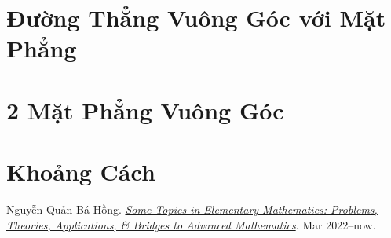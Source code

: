 \documentclass[oneside]{book}
\numberwithin{equation}{section}
\begin{document}
\section{Đường Thẳng Vuông Góc với Mặt Phẳng}

\section{2 Mặt Phẳng Vuông Góc}

\section{Khoảng Cách}


\begin{thebibliography}{99}
	 Nguyễn Quản Bá Hồng. \href{https://github.com/NQBH/hobby/blob/master/elementary_mathematics/some_topics_in_elementary_mathematics_problems_theories_applications_bridges_to_advanced_mathematics/NQBH_some_topics_in_elementary_mathematics_problems_theories_applications_bridges_to_advanced_mathematics.pdf}{\textit{Some Topics in Elementary Mathematics: Problems, Theories, Applications, \& Bridges to Advanced Mathematics}}. Mar 2022--now.
\end{thebibliography}


\printbibliography[heading=bibintoc]
	
\end{document}
